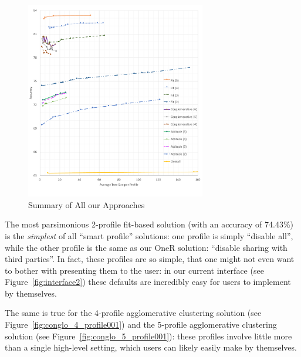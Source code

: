 \begin{figure}
	\centering
	\includegraphics[width=0.7\textwidth]{figures/summaryAll.pdf}
	\caption{Summary of All our Approaches}
	\label{fig:summary}
\end{figure}

The most parsimonious 2-profile fit-based solution (with an accuracy of 74.43\%) is the \emph{simplest} of all ``smart profile'' solutions: one profile is simply ``disable all'', while the other profile is the same as our OneR solution: ``disable sharing with third parties''. In fact, these profiles are so simple, that one might not even want to bother with presenting them to the user: in our current interface (see Figure~\ref{fig:interface2}) these defaults are incredibly easy for users to implement by themselves.

The same is true for the 4-profile agglomerative clustering solution (see Figure~\ref{fig:conglo_4_profile001}) and the 5-profile agglomerative clustering solution (see Figure~\ref{fig:conglo_5_profile001}): these profiles involve little more than a single high-level setting, which users can likely easily make by themselves. 

